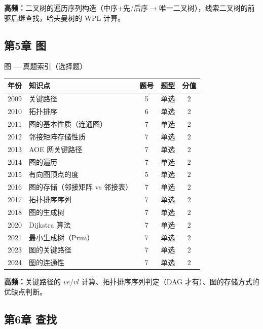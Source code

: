\noindent\textbf{高频：}二叉树的遍历序列构造（中序+先/后序$\to$唯一二叉树），线索二叉树的前驱后继查找，哈夫曼树的 WPL 计算。

\subsection*{第5章 图}

\begin{tablebox}{图 — 真题索引（选择题）}
\centering
\begin{tabular}{|c|l|c|c|c|}
\hline
年份 & 知识点 & 题号 & 题型 & 分值 \\
\hline
2009 & 关键路径 & 5 & 单选 & 2 \\
2010 & 拓扑排序 & 6 & 单选 & 2 \\
2011 & 图的基本性质（连通图）& 7 & 单选 & 2 \\
2012 & 邻接矩阵存储性质 & 7 & 单选 & 2 \\
2013 & AOE 网关键路径 & 7 & 单选 & 2 \\
2014 & 图的遍历 & 7 & 单选 & 2 \\
2015 & 有向图顶点的度 & 5 & 单选 & 2 \\
2016 & 图的存储（邻接矩阵 vs 邻接表）& 7 & 单选 & 2 \\
2017 & 拓扑排序序列 & 7 & 单选 & 2 \\
2018 & 图的生成树 & 7 & 单选 & 2 \\
2020 & Dijkstra 算法 & 7 & 单选 & 2 \\
2021 & 最小生成树（Prim）& 7 & 单选 & 2 \\
2023 & 图的关键路径 & 7 & 单选 & 2 \\
2024 & 图的连通性 & 7 & 单选 & 2 \\
\hline
\end{tabular}
\end{tablebox}

\noindent\textbf{高频：}关键路径的 $ve$/$vl$ 计算、拓扑排序序列判定（DAG 才有）、图的存储方式的优缺点判断。

\subsection*{第6章 查找}

